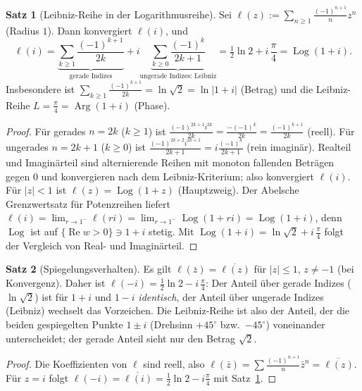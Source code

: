 \documentclass[a4paper,12pt,twoside]{report}
\theoremstyle{definition}
\newtheorem{satz}{Satz}
\begin{document}
\begin{satz}[Leibniz-Reihe in der Logarithmusreihe]\label{satz:ug:log}
Sei $\ell(z):=\sum_{n\ge1}\frac{(-1)^{n+1}}{n}z^n$ (Radius $1$). Dann konvergiert $\ell(i)$, und
\[
\ell(i)=\underbrace{\sum_{k\ge1}\frac{(-1)^{k+1}}{2k}}_{\text{gerade Indizes}}+i\underbrace{\sum_{k\ge0}\frac{(-1)^k}{2k+1}}_{\text{ungerade Indizes: Leibniz}}=\tfrac12\ln2+i\,\frac\pi4=\operatorname{Log}(1+i).
\]
Insbesondere ist $\sum_{k\ge1}\frac{(-1)^{k+1}}{2k}=\ln\sqrt2=\ln|1+i|$ (Betrag) und die Leibniz-Reihe $L=\frac\pi4=\operatorname{Arg}(1+i)$ (Phase).
\end{satz}

\begin{proof}
Für gerades $n=2k$ ($k\ge1$) ist $\frac{(-1)^{2k+1}i^{2k}}{2k}=\frac{-(-1)^k}{2k}=\frac{(-1)^{k+1}}{2k}$ (reell). Für ungerades $n=2k+1$ ($k\ge0$) ist $\frac{(-1)^{2k+2}i^{2k+1}}{2k+1}=i\frac{(-1)^k}{2k+1}$ (rein imaginär). Realteil und Imaginärteil sind alternierende Reihen mit monoton fallenden Beträgen gegen $0$ und konvergieren nach dem Leibniz-Kriterium; also konvergiert $\ell(i)$. Für $|z|<1$ ist $\ell(z)=\operatorname{Log}(1+z)$ (Hauptzweig). Der Abelsche Grenzwertsatz für Potenzreihen \cite{apostol_calculus} liefert $\ell(i)=\lim_{r\to1^-}\ell(ri)=\lim_{r\to1^-}\operatorname{Log}(1+ri)=\operatorname{Log}(1+i)$, denn $\operatorname{Log}$ ist auf $\{\operatorname{Re}w>0\}\ni1+i$ stetig. Mit $\operatorname{Log}(1+i)=\ln\sqrt2+i\,\frac\pi4$ folgt der Vergleich von Real- und Imaginärteil.
\end{proof}

\begin{satz}[Spiegelungsverhalten]\label{satz:ug:konj}
Es gilt $\ell(\bar z)=\overline{\ell(z)}$ für $|z|\le1$, $z\ne-1$ (bei Konvergenz). Daher ist $\ell(-i)=\tfrac12\ln2-i\,\frac\pi4$: Der Anteil über gerade Indizes ($\ln\sqrt2$) ist für $1+i$ und $1-i$ \emph{identisch}, der Anteil über ungerade Indizes (Leibniz) wechselt das Vorzeichen. Die Leibniz-Reihe ist also der Anteil, der die beiden gespiegelten Punkte $1\pm i$ (Drehsinn $+45^\circ$ bzw.\ $-45^\circ$) voneinander unterscheidet; der gerade Anteil sieht nur den Betrag $\sqrt2$.
\end{satz}

\begin{proof}
Die Koeffizienten von $\ell$ sind reell, also $\ell(\bar z)=\sum\frac{(-1)^{n+1}}{n}\bar z^n=\overline{\ell(z)}$. Für $z=i$ folgt $\ell(-i)=\overline{\ell(i)}=\tfrac12\ln2-i\frac\pi4$ mit Satz~\ref{satz:ug:log}.
\end{proof}
\end{document}
